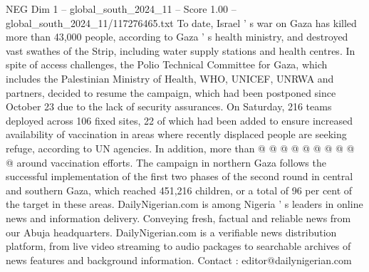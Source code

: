 \begin{textsample}{NEG Dim 1 – global\_south\_2024\_11 – Score 1.00 – global\_south\_2024\_11/117276465.txt}
To date, Israel ' s war on Gaza has killed more than 43,000 people, according to Gaza ' s health ministry, and destroyed vast swathes of the Strip, including water supply stations and health centres.
In spite of access challenges, the Polio Technical Committee for Gaza, which includes the Palestinian Ministry of Health, WHO, UNICEF, UNRWA and partners, decided to resume the campaign, which had been postponed since October 23 due to the lack of security assurances.
On Saturday, 216 teams deployed across 106 fixed sites, 22 of which had been added to ensure increased availability of vaccination in areas where recently displaced people are seeking refuge, according to UN agencies.
In addition, more than @ @ @ @ @ @ @ @ @ @ around vaccination efforts.
The campaign in northern Gaza follows the successful implementation of the first two phases of the second round in central and southern Gaza, which reached 451,216 children, or a total of 96 per cent of the target in these areas.
DailyNigerian.com is among Nigeria ' s leaders in online news and information delivery.
Conveying fresh, factual and reliable news from our Abuja headquarters.
DailyNigerian.com is a verifiable news distribution platform, from live video streaming to audio packages to searchable archives of news features and background information.
Contact : editor@dailynigerian.com

\end{textsample}
